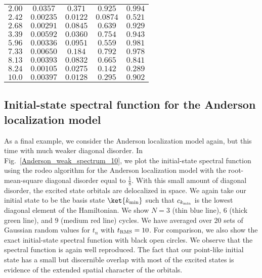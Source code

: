 \begin{table}[h]
\begin{center}
\begin{tabular}{|c|c|c|c|c|}
$ 2.00 $ & $  0.0357 $ & $  0.371 $ & $  0.925 $ & $  0.994  $ \\
$ 2.42 $ & $  0.00235 $ & $  0.0122 $ & $  0.0874 $ & $  0.521  $ \\
$ 2.68 $ & $  0.00291 $ & $  0.0845 $ & $  0.639 $ & $  0.929  $ \\
$ 3.39 $ & $  0.00592 $ & $  0.0360 $ & $  0.754 $ & $  0.943  $ \\
$ 5.96 $ & $  0.00336 $ & $  0.0951 $ & $  0.559 $ & $  0.981  $ \\
$ 7.33 $ & $  0.00650 $ & $  0.184 $ & $  0.792 $ & $  0.978  $ \\
$ 8.13 $ & $  0.00393 $ & $  0.0832 $ & $  0.665 $ & $  0.841  $ \\
$ 8.24 $ & $  0.00105 $ & $  0.0275 $ & $  0.142 $ & $  0.289  $ \\
$ 10.0 $ & $  0.00397 $ & $  0.0128 $ & $  0.295 $ & $  0.902 $ \\

\hline
\end{tabular}

\end{center}
\end{table}

\subsection{Initial-state spectral function for the Anderson localization model}

As a final example, we consider the Anderson localization model again, but this time with much weaker diagonal disorder.  In Fig.~\ref{Anderson_weak_spectrum_10}, we plot the initial-state spectral function using the rodeo algorithm for the Anderson localization model with the root-mean-square diagonal disorder equal to $\tfrac{1}{8}$.  With this small amount of diagonal disorder, the excited state orbitals are delocalized in space.  We again take our initial state to be the basis state $\ket{k_{\rm min}}$ such that $c_{k_{\rm min}}$ is the lowest diagonal element of the Hamiltonian. We show $N=3$ (thin blue line), $6$ (thick green line), and $9$ (medium red line) cycles. We have averaged over $20$ sets of Gaussian random values for $t_n$ with $t_{\rm RMS}=10$.  For comparison, we also show the exact initial-state spectral function with black open circles.  We observe that the spectral function is again well reproduced.  The fact that our point-like initial state has a small but discernible overlap with most of the excited states is evidence of the extended spatial character of the orbitals.

